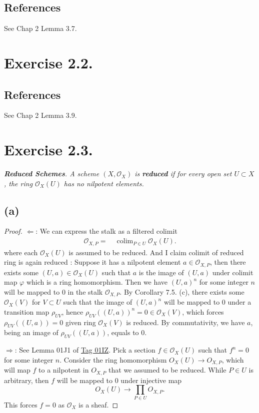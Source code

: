 \subsection{References}

See \cite{qing2006algebraic} Chap 2 Lemma 3.7. 

\section{Exercise 2.2.}

\subsection{References}

See \cite{qing2006algebraic} Chap 2 Lemma 3.9.

\section{Exercise 2.3.}
\textit{\textbf{Reduced Schemes}. A scheme $(X,\mathcal O_X)$ is \textbf{reduced} if for every open set $U\subset X$, the ring $\mathcal O_X(U)$ has no nilpotent elements.}

\subsection{(a)}

\begin{proof}
    $\Leftarrow$:
    We can express the stalk as a filtered colimit 
    \begin{align*}
        \mathcal O_{X,P}
        =&~ \operatorname{colim}_{P\in U}\mathcal O_X(U).
    \end{align*} where each $\mathcal O_X(U)$ is assumed to be reduced. 
    And I claim colimit of reduced ring is again reduced :
    Suppose it has a nilpotent element $a\in\mathcal O_{X,P}$, then there exists some $(U,a)\in \mathcal O_X(U)$ such that $a$ is the image of $(U,a)$ under colimit map $\varphi$ which is a ring homomorphism. Then we have $(U,a)^n$ for some integer $n$ will be mapped to $0$ in the stalk $\mathcal O_{X,P}$. By \cite{altman2013term} Corollary 7.5. (c), there exists some $\mathcal O_X(V)$ for $V\subset U$ such that the image of $(U,a)^n$ will be mapped to $0$ under a transition map $\rho_{UV}$, hence $\rho_{UV}((U,a))^n=0\in\mathcal O_X(V)$, which forces $\rho_{UV}((U,a))=0$ given ring $\mathcal O_X(V)$ is reduced. By commutativity, we have $a$, being an image of $\rho_{UV}((U,a))$, equals to $0$. 

    $\Rightarrow$: 
    See Lemma 01J1 of \href{https://stacks.math.columbia.edu/tag/01IZ}{Tag 01IZ}. 
    Pick a section $f\in\mathcal O_X(U)$ such that $f^n=0$ for some integer $n$. 
    Consider the ring homomorphism $O_X(U)\to O_{X,P}$, which will map $f$ to a nilpotent in $O_{X,P}$ that we assumed to be reduced. While $P\in U$ is arbitrary, then $f$ will be mapped to $0$ under injective map 
    \[O_X(U)\to \prod_{P\in U}O_{X,P}.\] This forces $f=0$ as $\mathcal O_X$ is a sheaf.
\end{proof} 

